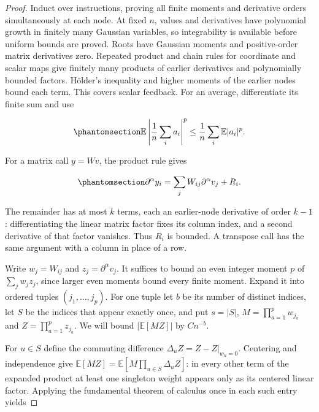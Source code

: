 \documentclass[
  11pt,
]{article}
\theoremstyle{definition}
\theoremstyle{plain}
\theoremstyle{plain}
\theoremstyle{plain}
\theoremstyle{remark}
\begin{document}
\begin{proof}
Induct over instructions, proving all finite moments and derivative
orders simultaneously at each node. At fixed \(n\), values and
derivatives have polynomial growth in finitely many Gaussian variables,
so integrability is available before uniform bounds are proved. Roots
have Gaussian moments and positive-order matrix derivatives zero.
Repeated product and chain rules for coordinate and scalar maps give
finitely many products of earlier derivatives and polynomially bounded
factors. Hölder's inequality and higher moments of the earlier nodes
bound each term. This covers scalar feedback. For an average,
differentiate its finite sum and use

\begin{equation}\protect\phantomsection\label{eq-mfp-average-jensen}{
\mathbb E\left|\frac1n\sum_i a_i\right|^p
\le\frac1n\sum_i\mathbb E|a_i|^p.
}\end{equation}

For a matrix call \(y=Wv\), the product rule gives

\begin{equation}\protect\phantomsection\label{eq-mfp-matrix-derivative}{
\partial^\alpha y_i=\sum_jW_{ij}\partial^\alpha v_j+R_i.
}\end{equation}

The remainder has at most \(k\) terms, each an earlier-node derivative
of order \(k-1\): differentiating the linear matrix factor fixes its
column index, and a second derivative of that factor vanishes. Thus
\(R_i\) is bounded. A transpose call has the same argument with a column
in place of a row.

Write \(w_j=W_{ij}\) and \(z_j=\partial^\alpha v_j\). It suffices to
bound an even integer moment \(p\) of \(\sum_jw_jz_j\), since larger
even moments bound every finite moment. Expand it into ordered tuples
\((j_1,\ldots,j_p)\). For one tuple let \(b\) be its number of distinct
indices, let \(S\) be the indices that appear exactly once, and put
\(s=|S|\), \(M=\prod_{a=1}^p w_{j_a}\) and \(Z=\prod_{a=1}^p z_{j_a}\).
We will bound \(|\mathbb E[MZ]|\) by \(C n^{-b}\).

For \(u\in S\) define the commuting difference
\(\Delta_uZ=Z-Z|_{w_u=0}\). Centering and independence give
\(\mathbb E[MZ]=\mathbb E[M\prod_{u\in S}\Delta_u Z]\): in every other
term of the expanded product at least one singleton weight appears only
as its centered linear factor. Applying the fundamental theorem of
calculus once in each such entry yields


\end{proof}
\end{document}
